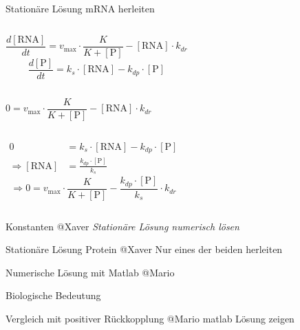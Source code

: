 \documentclass[11pt,aspectratio=169,reqno]{beamer}
\begin{document}
\begin{frame}[t]{Stationäre Lösung mRNA herleiten}
    \begin{columns}[t]
            \[\frac{d[\text{RNA}]}{dt}=v_{\text{max}}\cdot\frac{K}{K+[\text{P}]}-[\text{RNA}] \cdot k_{dr}\]
            \[\frac{d[\text{P}]}{dt}= k_s\cdot[\text{RNA}]-k_{dp}\cdot[\text{P}]\]
    \end{columns}
    \vspace{20pt}
    \pause
    \begin{columns}[t]
            \[\]
            \[0=v_{\text{max}}\cdot\frac{K}{K+[\text{P}]}-[\text{RNA}] \cdot k_{dr}\]
    \end{columns}
    \pause
    \begin{columns}[t]
            \begin{align*}
                0&= k_s\cdot[\text{RNA}]-k_{dp}\cdot[\text{P}] \\
                \Rightarrow [\text{RNA}]&=\frac{k_{dp} \cdot [\text{P}]}{k_s}
            \end{align*}
            \[\Rightarrow 0=v_{\text{max}}\cdot\frac{K}{K+[\text{P}]}-{\frac{k_{dp} \cdot [\text{P}]}{k_s}} \cdot k_{dr}\]
    \end{columns}
    
\end{frame}

\begin{frame}{Konstanten}
    @Xaver
    \emph{Stationäre Lösung numerisch lösen}
\end{frame}

\begin{frame}{Stationäre Lösung Protein}
@Xaver
Nur eines der beiden herleiten
\end{frame}

\begin{frame}{Numerische Lösung mit Matlab}
@Mario
\end{frame}

\begin{frame}{Biologische Bedeutung}
\end{frame}

\begin{frame}{Vergleich mit positiver Rückkopplung}
@Mario matlab Lösung zeigen
\end{frame}
\end{document}
